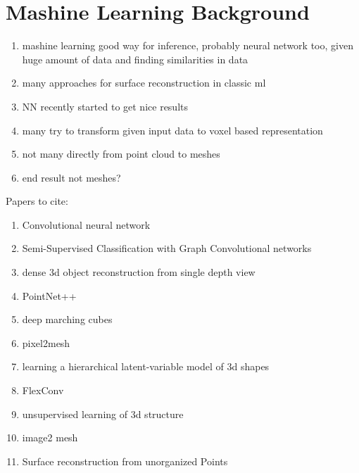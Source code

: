 \section{Mashine Learning Background}
\begin{enumerate}
  \item mashine learning good way for inference, probably neural network too, given huge amount of data and finding similarities in data
  \item many approaches for surface reconstruction in classic ml
  \item NN recently started to get nice results
  \item many try to transform given input data to voxel based representation
  \item not many directly from point cloud to meshes

  \item end result not meshes?
\end{enumerate}
Papers to cite:
\begin{enumerate}
  \item Convolutional neural network
  \item Semi-Supervised Classification with Graph Convolutional networks
  \item dense 3d object reconstruction from single depth view
  \item PointNet++
  \item deep marching cubes
  \item pixel2mesh
  \item learning a hierarchical latent-variable model of 3d shapes
  \item FlexConv
  \item unsupervised learning of 3d structure
  \item image2 mesh
  \item Surface reconstruction from unorganized Points
\end{enumerate}
